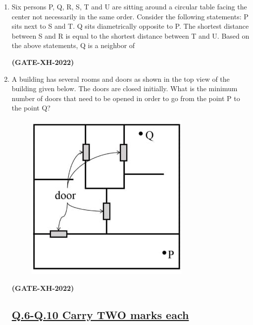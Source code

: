 \documentclass[journal]{IEEEtran}
\begin{document}
\begin{enumerate}
\item Six persons P, Q, R, S, T and U are sitting around a circular table facing the center not necessarily in the same order. Consider the following statements: P sits next to S and T. Q sits diametrically opposite to P. The shortest distance between S and R is equal to the shortest distance between T and U. Based on the above statements, Q is a neighbor of
\begin{enumerate}
\end{enumerate}
\hfill\textbf{(GATE-XH-2022)}

\item A building has several rooms and doors as shown in the top view of the building given below. The doors are closed initially. What is the minimum number of doors that need to be opened in order to go from the point P to the point Q?
\begin{figure}[h!]
\centering
\includegraphics[width=0.5\columnwidth]{figs/Q5.jpg}
\caption*{}
\label{fig:placeholder}
\end{figure}
\begin{enumerate}
\end{enumerate}
\hfill\textbf{(GATE-XH-2022)}
\subsection*{ \underline{ \textbf{Q.6-Q.10 Carry TWO marks each}}}
\vspace{0.3cm}


\end{enumerate}
\end{document}
